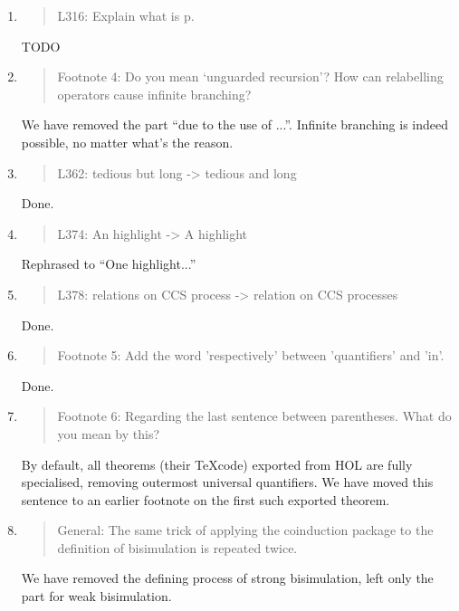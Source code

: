 \begin{enumerate}
\item \begin{quote}
    L316: Explain what is p.
  \end{quote}
  TODO
  
\item \begin{quote}
    Footnote 4: Do you mean ‘unguarded recursion’? How can relabelling operators cause infinite branching?
  \end{quote}
  We have removed the part ``due to the use of ...''. Infinite
  branching is indeed possible, no matter what's the reason.
  
\item \begin{quote}
    L362: tedious but long -> tedious and long
  \end{quote}
  Done.
  
\item \begin{quote}
    L374: An highlight -> A highlight
  \end{quote}
  Rephrased to ``One highlight...''
  
\item \begin{quote}
    L378: relations on CCS process -> relation on CCS processes
  \end{quote}
  Done.
  
\item \begin{quote}
    Footnote 5: Add the word 'respectively' between 'quantifiers' and 'in'.
  \end{quote}
  Done.
  
\item \begin{quote}
    Footnote 6: Regarding the last sentence between parentheses. What do you mean by this?
  \end{quote}
  By default, all theorems (their \TeX code) exported from HOL are
  fully specialised, removing outermost universal quantifiers. We have
  moved this sentence to an earlier footnote on the first such exported theorem.
  
\item \begin{quote}
    General: The same trick of applying the coinduction package to the
    definition of bisimulation is repeated twice.
  \end{quote}
  We have removed the defining process of strong bisimulation, left
  only the part for weak bisimulation.
  

\end{enumerate}
